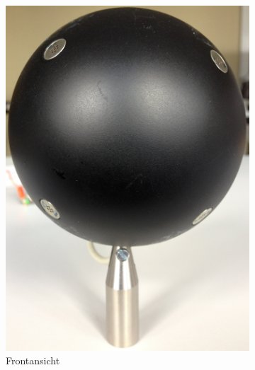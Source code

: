 \begin{figure}
        \centering
        \begin{subfigure}[b]{0.34\textwidth}
                \centering
                \includegraphics[width=\textwidth]{images/02_Konzeptionierung/Foto_MikrofonArray_Frontansicht}
                \caption{Frontansicht}
                \label{fig:Foto_MikrofonArray_Frontansicht}
        \end{subfigure}
        ~ %
        \begin{subfigure}[b]{0.35\textwidth}
                \centering

\end{subfigure}
\end{figure}
